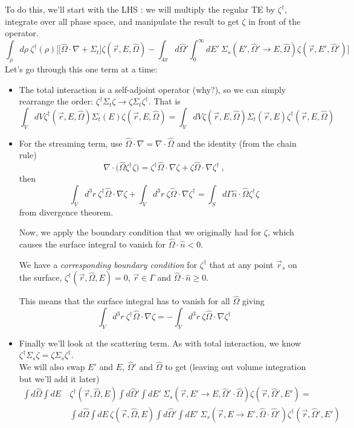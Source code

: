 \documentclass[12pt]{article}
\newcommand{\rvec}{\ensuremath{\vec{r}}}
\newcommand{\vOmega}{\ensuremath{\hat{\Omega}}}
\begin{document}
To do this, we'll start with the LHS : we will multiply the regular TE by $\zeta^{\dagger}$, integrate over all phase space, and manipulate the result to get $\zeta$ in front of the operator.
%
\[\int_{\rho} d\rho\: \zeta^{\dagger}(\rho)\biggl[ \bigl[\vOmega \cdot \nabla + \Sigma_t\bigr] \zeta(\vec{r}, E, \vOmega) - \int_{4 \pi} d\vOmega' \int_0^{\infty} dE' \: \Sigma_s(E', \vOmega' \rightarrow E, \vOmega) \zeta(\vec{r}, E', \vOmega') \biggr]\]
% 
Let's go through this one term at a time:
\begin{itemize}
\item The total interaction is a self-adjoint operator (why?), so we can simply rearrange the order: $\zeta^{\dagger} \Sigma_t \zeta \rightarrow \zeta \Sigma_t \zeta^{\dagger}$. That is
\[\int_V dV \zeta^{\dagger}(\vec{r}, E, \vOmega) \Sigma_t(E) \zeta(\vec{r}, E, \vOmega) = \int_V dV \zeta(\vec{r}, E, \vOmega) \Sigma_t(\rvec,E) \zeta^{\dagger}(\vec{r}, E, \vOmega)\]
%
\item For the streaming term, use $\vOmega \cdot \nabla = \nabla \cdot \vOmega$ and the identity (from the chain rule)
\[\nabla \cdot \bigl(\vOmega \zeta^{\dagger} \zeta \bigr) = \zeta^{\dagger}\vOmega \cdot \nabla \zeta + \zeta \vOmega \cdot \nabla \zeta^{\dagger}\:,\]
then
\[
\int_V d^3r \:\zeta^{\dagger}\vOmega \cdot \nabla \zeta + \int_V d^3r \:\zeta \vOmega \cdot \nabla \zeta^{\dagger} = \int_S d \Gamma \hat{n} \cdot \vOmega \zeta^{\dagger} \zeta
\]
from divergence theorem. 

Now, we apply the boundary condition that we originally had for $\zeta$, which causes the surface integral to vanish for $\vOmega \cdot \hat{n} < 0$.

We have a \textit{corresponding boundary condition} for $\zeta^{\dagger}$ that at any point $\rvec_s$ on the surface, $\zeta^{\dagger}(\rvec, \vOmega, E) = 0$, $\vec{r} \in \Gamma$ and $\vOmega \cdot \hat{n} \geq 0$.

This means that the surface integral has to vanish for all $\vOmega$ giving
\[
\int_V d^3r \:\zeta^{\dagger}\vOmega \cdot \nabla \zeta = -\int_V d^3r \:\zeta \vOmega \cdot \nabla \zeta^{\dagger}
\]
%
\item Finally we'll look at the scattering term. As with total interaction, we know $\zeta^{\dagger} \Sigma_s \zeta  = \zeta \Sigma_s \zeta^{\dagger}$. \\
We will also swap $E'$ and $E$, $\vOmega'$ and $\vOmega$ to get (leaving out volume integration but we'll add it later)
\begin{align*}
\int d\vOmega \int dE\: &\zeta^{\dagger}(\rvec, \vOmega, E) \int d\vOmega' \int dE'\: \Sigma_s(\rvec, E' \rightarrow E, \vOmega' \cdot \vOmega) \zeta(\rvec, \vOmega', E') = \\
%
&\int d\vOmega \int dE\: \zeta(\rvec, \vOmega, E) \int d\vOmega' \int dE'\: \Sigma_s(\rvec, E \rightarrow E', \vOmega \cdot \vOmega') \zeta^{\dagger}(\rvec, \vOmega', E') 
\end{align*}
\end{itemize}
\end{document}
